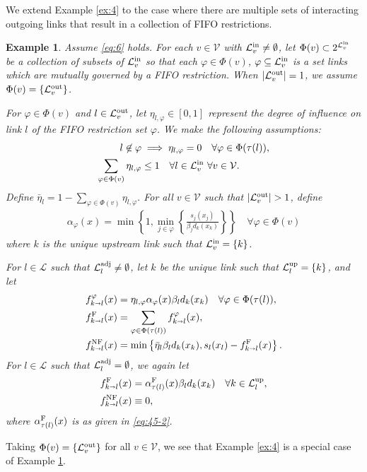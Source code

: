 \documentclass[letterpaper, 10 pt, conference]{ieeeconf}
\newcommand{\sra}{\shortrightarrow}
\newtheorem{example}{Example}
\newcommand{\fluxin}{s}
\newcommand{\fluxout}{d}
\newcommand{\Verts}{\mathcal{V}}
\newcommand{\Links}{\mathcal{L}}
\newcommand{\Lin}{\mathcal{L}^\textnormal{in}}
\newcommand{\Lout}{\mathcal{L}^\textnormal{out}}
\newcommand{\Lup}{\mathcal{L}^\textnormal{up}}
\newcommand{\Ladj}{\mathcal{L}^\textnormal{adj}}
\newcommand{\tail}{{\tau}}
\newcommand{\alphaF}{\alpha^\textnormal{F}}
\renewcommand{\phi}{\varphi}
\begin{document}
We extend Example \ref{ex:4} to the case where there are multiple sets of interacting outgoing links that result in a collection of FIFO restrictions.
\newcommand{\F}{\mathcal{F}}
\begin{example}
  \label{ex:5}
Assume \eqref{eq:6} holds. For each $v\in\Verts$ with $\Lin_v\neq\emptyset$, let $\Phi(v)\subset 2^{\Lin_v}$ be a collection of subsets of $\Lin_v$ so that each $\varphi\in\Phi(v)$, $\phi\subseteq \Lin_v$ is a set links which are mutually governed by a FIFO restriction. When $|\Lout_v|=1$, we assume $\Phi(v)=\{\Lout_v\}$.

 For $\phi\in\Phi(v)$ and $l\in\Lout_v$, let $\eta_{l,\phi}\in[0,1]$ represent the degree of influence on link $l$ of the FIFO restriction set $\phi$. We make the following assumptions:
\begin{align}
  \label{eq:4-0}  l\not\in \phi&\implies \eta_{l,\phi}=0\quad \forall \phi\in\Phi(\tail(l)),\\
  \label{eq:4}  \sum_{\phi\in\Phi(v)}\eta_{l,\phi}&\leq 1\quad \forall l\in\Lin_v \ \forall v\in\Verts.
\end{align}
Define
$ \bar{\eta}_l=1-  \sum_{\phi\in\Phi(v)}\eta_{l,\phi}.$
For all $v\in\Verts$ such that $|\Lout_v|>1$, define
\begin{align}
  \label{eq:3}
  \alpha_\phi(x)=\min\left\{1,\min_{j\in\phi}\left\{\frac{\fluxin_j(x_j)}{\beta_{j}\fluxout_k(x_k)}\right\}\right\} \quad \forall \phi\in\Phi(v)
\end{align}
where $k$ is the unique upstream link such that $\Lin_v=\{k\}$.

For $l\in\Links$ such that $\Ladj_l\neq \emptyset$, let $k$ be the unique link such that $\Lup_l=\{k\}$, and let
\begin{align}
  \label{eq:8}
   f^\phi_{k\sra l}(x)&=\eta_{l,\phi}  \alpha_\phi(x) \beta_l\fluxout_k(x_k)\quad \forall \phi\in\Phi(\tail(l)), \\
\fF_{k\sra l}(x)&=\sum_{\phi\in\Phi(\tail(l))}f^\phi_{k\sra l}(x),\\
  \label{eq:8-2}  \fNF_{k\sra l}(x)&=\min\left\{\bar{\eta}_l\beta_l\fluxout_k(x_k),\fluxin_l(x_l) -  \fF_{k\sra l}(x)\right\}.
\end{align}
For $l\in\Links$ such that $\Ladj_l=\emptyset$, we again let
\begin{align}
  \label{eq:5}
\fF_{k\sra l}(x)&=\alphaF_{\tail(l)}(x) \beta_l\fluxout_k(x_k) \quad \forall k\in\Lup_l,\\
\fNF_{k\sra l}(x)&\equiv 0,
\end{align}
where $\alphaF_{\tail(l)}(x)$ is as given in \eqref{eq:45-2}.
\end{example}
Taking $\Phi(v)=\{\Lout_v\}$ for all $v\in\Verts$, we see that Example \ref{ex:4} is a special case of Example \ref{ex:5}.
\end{document}
